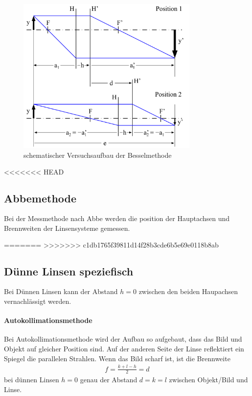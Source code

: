 \documentclass[11pt, a4paper]{article}
\begin{document}
    \begin{figure}
        \centering
        \includegraphics[width=0.8\textwidth]{Bessel_Abb.png}
        \caption{schematischer Versuchsaufbau der Besselmethode \cite{OPA}}   %
        \label{fig:BesselAbb}
    \end{figure}

<<<<<<< HEAD
    \subsection{Abbemethode}

    Bei der Messmethode nach Abbe werden die position der Hauptachsen und Brennweiten der Linsensysteme gemessen. 


=======
>>>>>>> c1db1765f39811d14f28b3cde6b5e69e0118b8ab
    \subsection{Dünne Linsen speziefisch}
    Bei Dünnen Linsen kann der Abstand $h = 0$ zwischen den beiden Haupachsen vernachlässigt werden.
    
    \paragraph{Autokollimationsmethode}
    Bei Autokollimationsmethode wird der Aufbau so aufgebaut, dass das Bild und Objekt auf gleicher Position sind. Auf der anderen Seite der Linse reflektiert ein Spiegel die parallelen Strahlen. Wenn das Bild scharf ist, ist die Brennweite
    \begin{align}
        f = \frac{k + l - h}{2}  = d \label{eq:auto}
    \end{align}
    bei dünnen Linsen $h=0$ genau der Abstand $d = k = l$ zwischen Objekt/Bild und Linse.
\end{document}

